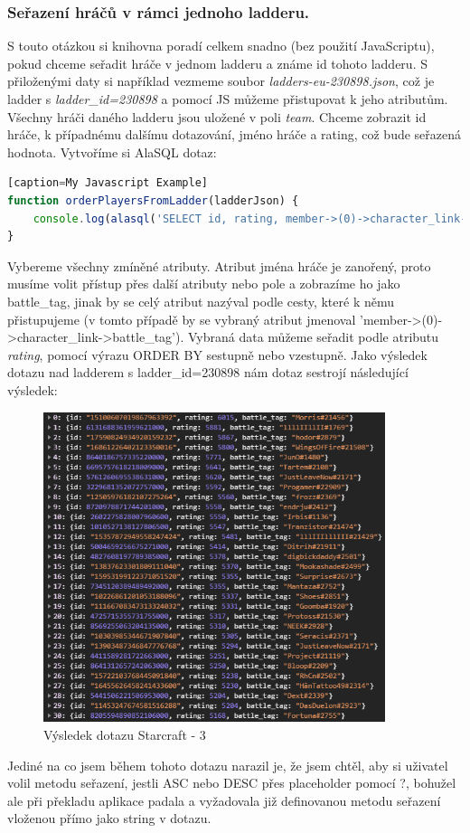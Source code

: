 \documentclass[a4, titlepage]{article}
\begin{document}
\subsubsection{Seřazení hráčů v rámci jednoho ladderu.}
S touto otázkou si knihovna poradí celkem snadno (bez použití JavaScriptu), pokud chceme seřadit hráče v jednom ladderu a známe id tohoto ladderu. S přiloženými daty si například vezmeme soubor \textit{ladders-eu-230898.json}, což je ladder s \textit{ladder\_id=230898} a pomocí JS můžeme přistupovat k jeho atributům. Všechny hráči daného ladderu jsou uložené v poli \textit{team}. Chceme zobrazit id hráče, k případnému dalšímu dotazování, jméno hráče a rating, což bude seřazená hodnota. Vytvoříme si AlaSQL dotaz:
\begin{lstlisting}[language=JavaScript][caption=My Javascript Example]
function orderPlayersFromLadder(ladderJson) {
    console.log(alasql('SELECT id, rating, member->(0)->character_link->battle_tag AS battle_tag FROM ? ORDER BY rating DESC', [ladderJson.team]));
}
\end{lstlisting}
Vybereme všechny zmíněné atributy. Atribut jména hráče je zanořený, proto musíme volit přístup přes další atributy nebo pole a zobrazíme ho jako battle\_tag, jinak by se celý atribut nazýval podle cesty, které k němu přistupujeme (v tomto případě by se vybraný atribut jmenoval 'member->(0)->character\_link->battle\_tag'). 
Vybraná data můžeme seřadit podle atributu \textit{rating}, pomocí výrazu ORDER BY sestupně nebo vzestupně. Jako výsledek dotazu nad ladderem s ladder\_id=230898 nám dotaz sestrojí následující výsledek:
\begin{figure}[h]
    \centering
    \includegraphics[width=10cm]{S3}
    \caption{Výsledek dotazu Starcraft - 3}
\end{figure}
Jediné na co jsem během tohoto dotazu narazil je, že jsem chtěl, aby si uživatel volil metodu seřazení, jestli ASC nebo DESC přes placeholder pomocí ?, bohužel ale při překladu aplikace padala a vyžadovala již definovanou metodu seřazení vloženou přímo jako string v dotazu.
\newpage
\end{document}
